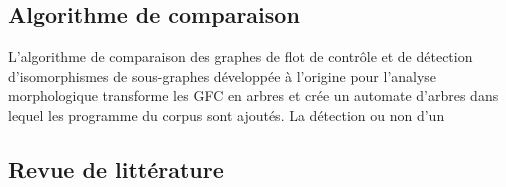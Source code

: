 \subsection{Algorithme de comparaison}
L'algorithme de comparaison des graphes de flot de contrôle et de détection d'isomorphismes de sous-graphes développée à l'origine pour l'analyse morphologique \cite{BKM08} transforme les GFC en arbres et crée un automate d'arbres dans lequel les programme du corpus sont ajoutés.
La détection ou non d'un

\subsection{Revue de littérature}

